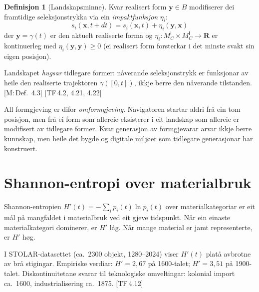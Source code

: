 \documentclass[10pt]{book}
\theoremstyle{definition}
\newtheorem{definisjon}{Definisjon}[chapter]
\theoremstyle{plain}
\theoremstyle{remark}
\newcommand{\MC}{M^{\mathsf{I}}_C}
\providecommand{\R}{}
\renewcommand{\R}{\mathbf{R}}
\newcommand{\TF}[1]{\textnormal{[TF\,#1]}}
\newcommand{\Mref}[1]{\textnormal{[M:\,#1]}}
\begin{document}
\begin{definisjon}[Landskapsminne]\label{def:minne}
Kvar realisert form $\bm{y} \in B$ modifiserer dei framtidige seleksjonstrykka via ein \emph{impaktfunksjon} $\eta_i$:
\[
  s_i(\bm{x}, t + dt) = s_i(\bm{x}, t) + \eta_i(\bm{y}, \bm{x})
\]
der $\bm{y} = \gamma(t)$ er den aktuelt realiserte forma og $\eta_i : \MC \times \MC \to \R$ er kontinuerleg med $\eta_i(\bm{y}, \bm{y}) \geq 0$ (ei realisert form forsterkar i det minste svakt sin eigen posisjon).

Landskapet \emph{hugsar} tidlegare former: n\aa verande seleksjonstrykk er funksjonar av heile den realiserte trajektoren $\gamma([0, t])$, ikkje berre den n\aa verande tilstanden. \Mref{Def.~4.3} \TF{4.2, 4.21, 4.22}
\end{definisjon}

All formgjeving er difor \emph{omformgjeving}. Navigatoren startar aldri fr\aa{} ein tom posisjon, men fr\aa{} ei form som allereie eksisterer i eit landskap som allereie er modifisert av tidlegare former. Kvar generasjon av formgjevarar arvar ikkje berre kunnskap, men heile det bygde og digitale milj\o et som tidlegare generasjonar har konstruert.

\section{Shannon-entropi over materialbruk}\label{sec:dyn:entropi}

Shannon-entropien $H'(t) = -\sum_i p_i(t) \ln p_i(t)$ over materialkategoriar er eit m\aa l p\aa{} mangfaldet i materialbruk ved eit gjeve tidspunkt. N\aa r ein einaste materialkategori dominerer, er $H'$ l\aa g. N\aa r mange material er jamt representerte, er $H'$ h\o g.

I STOLAR-datasettet (ca.~2300 objekt, 1280--2024) viser $H'(t)$ plat\aa{} avbrotne av br\aa{} stigingar. Empiriske verdiar: $H' = 2{,}67$ p\aa{} 1600-talet; $H' = 3{,}51$ p\aa{} 1900-talet. Diskontinuitetane svarar til teknologiske omveltingar: kolonial import ca.\ 1600, industrialisering ca.\ 1875. \TF{4.12}
\end{document}
